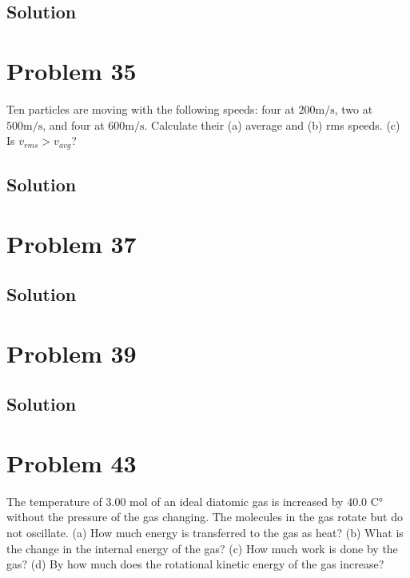 \documentclass[12pt]{article}
\begin{document}
        \subsection{Solution}

    \pagebreak
    \section{Problem 35}
        Ten particles are moving with the following speeds: four at $200 \unit{\meter/\second}$, two at $500 \unit{\meter/\second}$, and four at $600 \unit{\meter/\second}$. 
        Calculate their (a) average and (b) rms speeds. 
        (c) Is $v_{rms} > v_{avg}$?

        \subsection{Solution}

    \pagebreak
    \section{Problem 37}

        \subsection{Solution}

    \pagebreak
    \section{Problem 39}

        \subsection{Solution}

    \pagebreak
    \section{Problem 43}
        The temperature of 3.00 mol of an ideal diatomic gas is increased by 40.0 C° without the pressure of the gas changing.
        The molecules in the gas rotate but do not oscillate. 
        (a) How much energy is transferred to the gas as heat? 
        (b) What is the change in the internal energy of the gas? 
        (c) How much work is done by the gas? 
        (d) By how much does the rotational kinetic energy of the gas increase?
\end{document}
